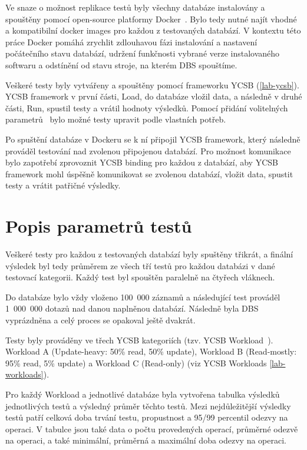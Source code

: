 \documentclass[czech,master,dept460,male,csharp,cpdeclaration]{diploma}
\begin{document}
	Ve snaze o možnost replikace testů byly všechny databáze instalovány a spouštěny pomocí open-source platformy Docker~\cite{docker}. Bylo tedy nutné najít vhodné a kompatibilní docker images pro každou z testovaných databází. V kontextu této práce Docker pomáhá zrychlit zdlouhavou fázi instalování a nastavení počátečního stavu databází, udržení funkčnosti vybrané verze instalovaného softwaru a odstínění od stavu stroje, na kterém DBS spouštíme.
	
	Veškeré testy byly vytvářeny a spouštěny pomocí frameworku YCSB (\ref{lab-ycsb}). YCSB framework v první části, Load, do databáze vložil data, a následně v druhé části, Run, spustil testy a vrátil hodnoty výsledků. Pomocí přidání volitelných parametrů~\cite{ycsb-properties} bylo možné testy upravit podle vlastních potřeb.
	
	Po spuštění databáze v Dockeru se k ní připojil YCSB framework, který následně prováděl testování nad zvolenou připojenou databází. Pro možnost komunikace bylo zapotřebí zprovoznit YCSB binding pro každou z databází, aby YCSB framework mohl úspěšně komunikovat se zvolenou databází, vložit data, spustit testy a vrátit patřičné výsledky.
	
	\section{Popis parametrů testů}
	
	Veškeré testy pro každou z testovaných databází byly spuštěny třikrát, a finální výsledek byl tedy průměrem ze všech tří testů pro každou databázi v dané testovací kategorii. Každý test byl spouštěn paralelně na čtyřech vláknech.
	
	Do databáze bylo vždy vloženo 100~000 záznamů a následující test prováděl 1~000~000 dotazů nad danou naplněnou databází. Následně byla DBS vyprázdněna a celý proces se opakoval ještě dvakrát.
	
	Testy byly prováděny ve třech YCSB kategoriích (tzv. YCSB Workload~\cite{workloads}). Workload A (Update-heavy: 50\% read, 50\% update), Workload B (Read-mostly: 95\% read, 5\% update) a Workload C (Read-only) (viz YCSB Workloads \ref{lab-workloads}).
	
	Pro každý Workload a jednotlivé databáze byla vytvořena tabulka výsledků jednotlivých testů a výsledný průměr těchto testů. Mezi nejdůležitější výsledky testů patří celková doba trvání testu, propustnost a 95/99 percentil odezvy na operaci. V tabulce jsou také data o počtu provedených operací, průměrné odezvě na operaci, a také minimální, průměrná a maximální doba odezvy na operaci.
	
\end{document}
